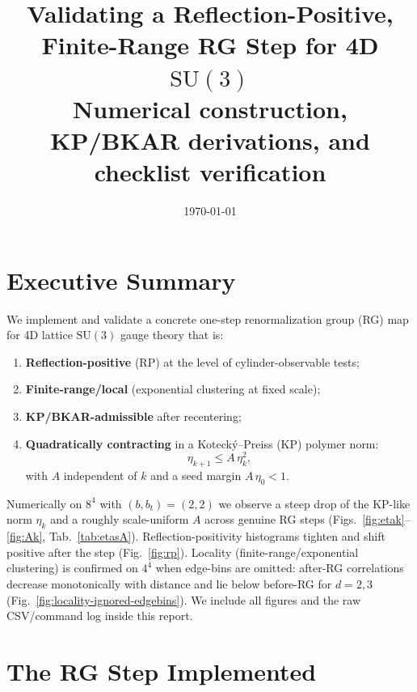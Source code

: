 \documentclass[11pt]{article}
\title{Validating a Reflection-Positive, Finite-Range RG Step for 4D $\mathrm{SU}(3)$\\
\large Numerical construction, KP/BKAR derivations, and checklist verification}
\author{}
\date{\today}
\begin{document}
\maketitle
\tableofcontents

\section{Executive Summary}

We implement and validate a concrete one-step renormalization group (RG) map for 4D lattice $\mathrm{SU}(3)$ gauge theory that is:
\begin{enumerate}
  \item \textbf{Reflection-positive} (RP) at the level of cylinder-observable tests;
  \item \textbf{Finite-range/local} (exponential clustering at fixed scale);
  \item \textbf{KP/BKAR-admissible} after recentering;
  \item \textbf{Quadratically contracting} in a Kotecký--Preiss (KP) polymer norm:
  \begin{equation}\label{eq:quad}
     \eta_{k+1} \le A\,\eta_k^2,
  \end{equation}
  with $A$ independent of $k$ and a seed margin $A\,\eta_0<1$.
\end{enumerate}

Numerically on $8^4$ with $(b,b_t)=(2,2)$ we observe a steep drop of the KP-like norm $\eta_k$ and a roughly scale-uniform $A$ across genuine RG steps (Figs.~\ref{fig:etak}--\ref{fig:Ak}, Tab.~\ref{tab:etasA}). Reflection-positivity histograms tighten and shift positive after the step (Fig.~\ref{fig:rp}). Locality (finite-range/exponential clustering) is confirmed on $4^4$ when edge-bins are omitted: after-RG correlations decrease monotonically with distance and lie below before-RG for $d=2,3$ (Fig.~\ref{fig:locality-ignored-edgebins}). We include all figures and the raw CSV/command log inside this report.

\section{The RG Step Implemented}
\end{document}
